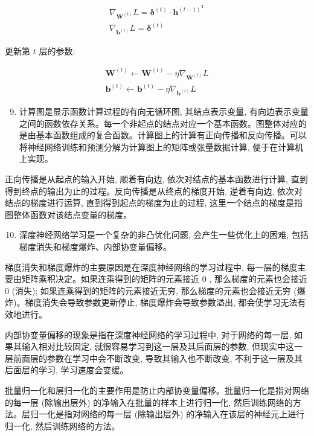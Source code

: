 \documentclass[10pt]{article}
\begin{document}
\begin{CJK*}{UTF8}{bsmi}
$$
\begin{gathered}
\nabla_{\boldsymbol{W}^{(t)}} L=\boldsymbol{\delta}^{(t)} \cdot \boldsymbol{h}^{(t-1)^{\mathrm{T}}} \\
\nabla_{\boldsymbol{b}^{(t)}} L=\boldsymbol{\delta}^{(t)}
\end{gathered}
$$

更新第 $t$ 层的参数:

$$
\begin{gathered}
\boldsymbol{W}^{(t)} \leftarrow \boldsymbol{W}^{(t)}-\eta \nabla_{\boldsymbol{W}^{(t)}} L \\
\boldsymbol{b}^{(t)} \leftarrow \boldsymbol{b}^{(t)}-\eta \nabla_{\boldsymbol{b}^{(t)}} L
\end{gathered}
$$

\begin{enumerate}
  \setcounter{enumi}{8}
  \item 计算图是显示函数计算过程的有向无循环图, 其结点表示变量, 有向边表示变量之间的函数依存关系。每一个非起点的结点对应一个基本函数。图整体对应的是由基本函数组成的复合函数。计算图上的计算有正向传播和反向传播。可以将神经网络训练和预测分解为计算图上的矩阵或张量数据计算, 便于在计算机上实现。
\end{enumerate}

正向传播是从起点的输入开始, 顺着有向边, 依次对结点的基本函数进行计算, 直到得到终点的输出为止的过程。反向传播是从终点的梯度开始, 逆着有向边, 依次对结点的梯度进行运算, 直到得到起点的梯度为止的过程, 这里一个结点的梯度是指图整体函数对该结点变量的梯度。

\begin{enumerate}
  \setcounter{enumi}{9}
  \item 深度神经网络学习是一个复杂的非凸优化问题, 会产生一些优化上的困难, 包括梯度消失和梯度爆炸、内部协变量偏移。
\end{enumerate}

梯度消失和梯度爆炸的主要原因是在深度神经网络的学习过程中, 每一层的梯度主要由矩阵乘积决定。如果连乘得到的矩阵的元素接近 0 , 那么梯度的元素也会接近 0 (消失); 如果连乘得到的矩阵的元素接近无穷, 那么梯度的元素也会接近无穷 (爆炸)。梯度消失会导致参数更新停止, 梯度爆炸会导致参数溢出, 都会使学习无法有效地进行。

内部协变量偏移的现象是指在深度神经网络的学习过程中, 对于网络的每一层, 如果其输入相对比较固定, 就很容易学习到这一层及其后面层的参数, 但现实中这一层前面层的参数在学习中会不断改变, 导致其输入也不断改变, 不利于这一层及其后面层的学习, 学习速度会变缓。

批量归一化和层归一化的主要作用是防止内部协变量偏移。批量归一化是指对网络的每一层 (除输出层外) 的净输入在批量的样本上进行归一化, 然后训练网络的方法。层归一化是指对网络的每一层 (除输出层外) 的净输入在该层的神经元上进行归一化, 然后训练网络的方法。


\end{CJK*}
\end{document}
